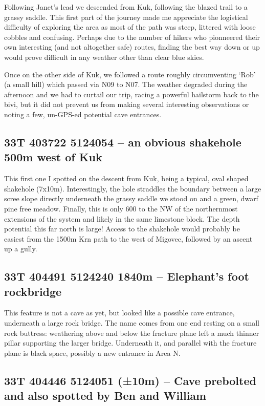 Following Janet’s lead we descended from Kuk, following the blazed trail to a grassy saddle. This first part of the journey made me appreciate the logistical difficulty of exploring the area as most of the path was steep, littered with loose cobbles and confusing. Perhaps due to the number of  hikers who pionneered their own interesting (and not altogether safe) routes, finding the best way down or up would prove difficult in any weather other than clear blue skies. 


Once on the other side of Kuk, we followed a route roughly circumventing ‘Rob’ (a small hill) which passed via N09 to N07. The weather degraded during the afternoon and we had to curtail our trip, racing a powerful hailstorm back to the bivi, but it did not prevent us from making several interesting observations or noting a few, un-GPS-ed potential cave entrances.

\subsection{33T 403722 5124054 – an obvious shakehole 500m west of Kuk}

This first one I spotted on the descent from Kuk, being a typical, oval shaped shakehole (7x10m). Interestingly, the hole straddles the boundary between a large scree slope directly underneath the grassy saddle we stood on and a green, dwarf pine free meadow.  Finally, this is only 600 to the NW of the northernmost extensions of the system and likely in the same limestone block. The depth potential this far north is large!  Access to the shakehole would probably be easiest from the 1500m Krn path to the west of Migovec, followed by an ascent up a gully. 

\subsection{33T 404491 5124240  1840m – Elephant’s foot rockbridge}
This feature is not a cave as yet, but looked like a possible cave entrance, underneath a large rock bridge. The name comes from one end resting on a small rock buttress: weathering above and below the fracture plane left a much thinner pillar supporting the larger bridge. Underneath it, and parallel with the fracture plane is black space, possibly a new entrance in Area N.

\subsection{33T 404446 5124051 (±10m) – Cave prebolted and also spotted by Ben and William}

